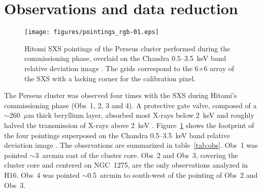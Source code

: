 \section{Observations and data reduction}
\label{sec:data}

\begin{figure}
 \begin{center}
  \texttt{[image: figures/pointings\_rgb-01.eps]}
 \end{center}
\caption{Hitomi SXS pointings of the Perseus cluster performed during the commissioning phase, overlaid on the Chandra 0.5--3.5~keV band relative deviation image \citep[reproduced from][]{Zhuravleva14}. The grids correspond to the 6$\times$6 array of the SXS with a lacking corner for the calibration pixel.}\label{fig:fov}
\end{figure}

\begin{table*}
 \label{tab:obs}
\end{table*}

The Perseus cluster was observed four times with the SXS during Hitomi's commissioning phase (Obs~1, 2, 3 and 4). A protective gate valve, composed of a $\sim$260~$\mu$m thick beryllium layer, absorbed most X-rays below 2~keV and roughly halved the transmission of X-rays above 2~keV \citep{eckart16}. %
Figure~\ref{fig:fov} shows the footprint of the four pointings superposed on the Chandra 0.5--3.5~keV band relative deviation image \citep[reproduced from][]{Zhuravleva14}. The observations are summarized in table~\ref{tab:obs}. Obs~1 was pointed $\sim$3~arcmin east of the cluster core. Obs~2 and Obs~3, covering the cluster core and centered on NGC~1275, are the only observations analyzed in H16. Obs~4 was pointed $\sim$0.5~arcmin to south-west of the pointing of Obs~2 and Obs~3.

